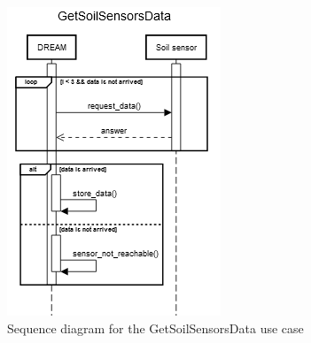\documentclass{article}
\begin{document}
\begin{figure}[H]
    \centering
    \includegraphics[scale=0.75]{sequence_diagrams/GetSoilSensorsData}
    \caption{Sequence diagram for the GetSoilSensorsData use case}
\end{figure}


\end{document}
